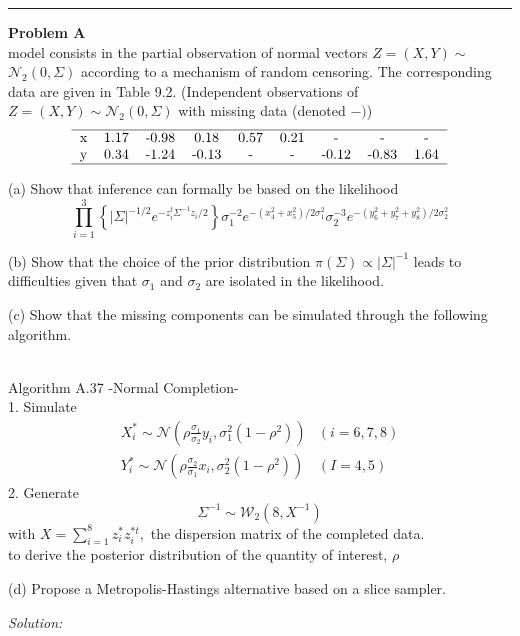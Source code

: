 \documentclass[a4paper, 11pt]{article}
\newenvironment{problem}[2][Problem]
    { \begin{mdframed}[backgroundcolor=gray!20] \textbf{#1 #2} \\}
    {  \end{mdframed}}
\newenvironment{solution}
    {\textit{Solution:}}
    {}
\begin{document}
\noindent\rule{7in}{2.8pt}
\begin{problem}{9.20}
A model consists in the partial observation of normal vectors $Z=(X, Y) \sim$ $\mathcal{N}_{2}(0, \Sigma)$ according to a mechanism of random censoring. The corresponding data are given in Table 9.2. (Independent observations of $Z=(X, Y) \sim \mathcal{N}_{2}(0, \Sigma)$ with missing data (denoted $-)$)
\[
\begin{tabular}{lcccccccc}
\hline 
x & 1.17 & -0.98 & 0.18 & 0.57 & 0.21 & - & - & - \\
y & 0.34 & -1.24 & -0.13 & - & - & -0.12 & -0.83 & 1.64 \\
\hline
\end{tabular} 
\]

(a) Show that inference can formally be based on the likelihood
\[
\prod_{i=1}^{3}\left\{|\Sigma|^{-1 / 2} e^{-z_{i}^{t} \Sigma^{-1} z_{i} / 2}\right\} \sigma_{1}^{-2} e^{-\left(x_{4}^{2}+x_{5}^{2}\right) / 2 \sigma_{1}^{2}} \sigma_{2}^{-3} e^{-\left(y_{6}^{2}+y_{7}^{2}+y_{8}^{2}\right) / 2 \sigma_{2}^{2}}
\]

(b) Show that the choice of the prior distribution $\pi(\Sigma) \propto|\Sigma|^{-1}$ leads to difficulties given that $\sigma_{1}$ and $\sigma_{2}$ are isolated in the likelihood.

(c) Show that the missing components can be simulated through the following algorithm.

~\\
Algorithm A.37 -Normal Completion-\\
1. Simulate
\[
\begin{array}{ll}
X_{i}^{*} \sim \mathcal{N}\left(\rho \frac{\sigma_{1}}{\sigma_{2}} y_{i}, \sigma_{1}^{2}\left(1-\rho^{2}\right)\right) & (i=6,7,8) \\
Y_{i}^{*} \sim \mathcal{N}\left(\rho \frac{\sigma_{2}}{\sigma_{1}} x_{i}, \sigma_{2}^{2}\left(1-\rho^{2}\right)\right) & (I=4,5)
\end{array}
\]
2. Generate
\[
\Sigma^{-1} \sim \mathcal{W}_{2}\left(8, X^{-1}\right)
\]
with $X=\sum_{i=1}^{8} z_{i}^{*} z_{i}^{* t},$ the dispersion matrix of the completed data.
~\\

to derive the posterior distribution of the quantity of interest, $\rho$

(d) Propose a Metropolis-Hastings alternative based on a slice sampler.

\end{problem}
\begin{solution}
	
	
\end{solution}
\end{document}
